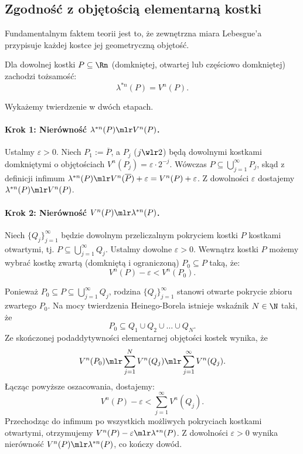 \subsection{Zgodność z objętością elementarną kostki}
Fundamentalnym faktem teorii jest to, że zewnętrzna miara Lebesgue'a przypisuje każdej kostce jej geometryczną objętość.
\begin{tw} Dla dowolnej kostki $P \subseteq \Rn$ (domkniętej, otwartej lub częściowo domkniętej) zachodzi tożsamość: \begin{equation*} \lambda^{*n}(P) = V^n(P). \end{equation*} \end{tw}
\begin{dow} Wykażemy twierdzenie w dwóch etapach.
    \paragraph{Krok 1: Nierówność $\lambda^{*n}(P) \mlr V^n(P)$.} Ustalmy $\varepsilon > 0$. Niech $P_1 := \overline{P}$, a $P_j$ ($j \wlr 2$) będą dowolnymi kostkami domkniętymi o objętościach $V^n(P_j) = \varepsilon \cdot 2^{-j}$. Wówczas $P \subseteq \bigcup_{j=1}^\infty P_j$, skąd z definicji infimum $\lambda^{*n}(P) \mlr V^n(\overline{P}) + \varepsilon = V^n(P) + \varepsilon$. Z dowolności $\varepsilon$ dostajemy $\lambda^{*n}(P) \mlr V^n(P)$.
    \paragraph{Krok 2: Nierówność $V^n(P) \mlr \lambda^{*n}(P)$.} Niech $\{Q_j\}_{j=1}^\infty$ będzie dowolnym przeliczalnym pokryciem kostki $P$ kostkami otwartymi, tj. $P \subseteq \bigcup_{j=1}^\infty Q_j$. Ustalmy dowolne $\varepsilon > 0$. Wewnątrz kostki $P$ możemy wybrać kostkę zwartą (domkniętą i ograniczoną) $P_0 \subseteq  P$ taką, że:
    \begin{equation*}
        V^n(P) - \varepsilon < V^n(P_0).
    \end{equation*}

    Ponieważ $P_0 \subseteq  P \subseteq  \bigcup_{j=1}^\infty Q_j$, rodzina $\{Q_j\}_{j=1}^\infty$ stanowi otwarte pokrycie zbioru zwartego $P_0$. Na mocy twierdzenia Heinego-Borela istnieje wskaźnik $N \in \N$ taki, że \begin{equation*} P_0 \subseteq Q_1 \cup Q_2 \cup \dots \cup Q_N. \end{equation*} Ze skończonej podaddytywności elementarnej objętości kostek wynika, że \begin{equation*} V^n(P_0) \mlr \sum_{j=1}^N V^n(Q_j) \mlr \sum_{j=1}^\infty V^n(Q_j). \end{equation*} Łącząc powyższe oszacowania, dostajemy:
    \begin{equation*}
        V^n(P) - \varepsilon < \sum_{j=1}^\infty V^n(Q_j).
    \end{equation*} Przechodząc do infimum po wszystkich możliwych pokryciach kostkami otwartymi, otrzymujemy $V^n(P) - \varepsilon \mlr \lambda^{*n}(P)$. Z dowolności $\varepsilon > 0$ wynika nierówność $V^n(P) \mlr \lambda^{*n}(P)$, co kończy dowód.
\end{dow}


